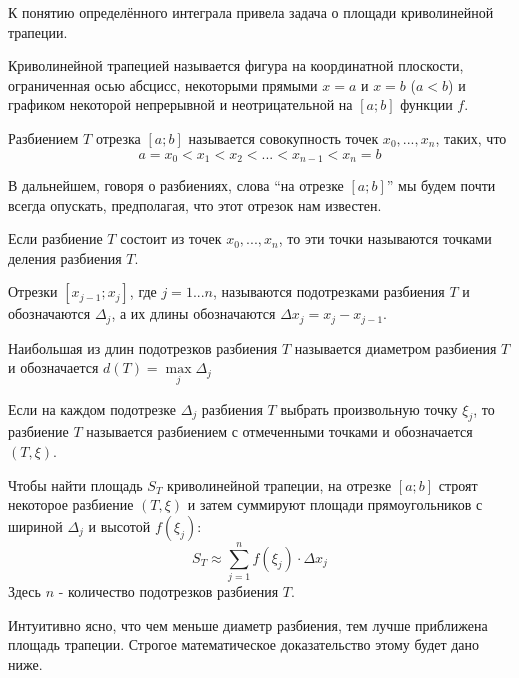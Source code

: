 К понятию определённого интеграла привела задача о площади криволинейной трапеции.

\opred
Криволинейной трапецией называется фигура на координатной плоскости, ограниченная осью абсцисс, некоторыми прямыми $x=a$ и $x=b$ ($a<b$) и графиком некоторой непрерывной и неотрицательной на $[a;b]$ функции $f$.

\opred 
Разбиением $T$ отрезка $[a;b]$ называется совокупность точек ${x_0,...,x_n}$, таких, что 
$$a=x_0<x_1<x_2<...<x_{n-1}<x_n=b$$

В дальнейшем, говоря о разбиениях, слова ``на отрезке $[a;b]$'' мы будем почти всегда опускать, предполагая, что этот отрезок нам известен.

\opred
Если разбиение $T$ состоит из точек ${x_0,...,x_n}$, то эти точки называются точками деления разбиения $T$.

\opred
Отрезки $[x_{j-1};x_j]$, где $j=1...n$, называются подотрезками разбиения $T$ и обозначаются $\Delta_j$, а их длины обозначаются $\Delta x_j=x_j-x_{j-1}$.

\opred
Наибольшая из длин подотрезков разбиения $T$ называется диаметром разбиения $T$ и обозначается $d(T)=\max\limits_j \Delta_j$

\opred
Если на каждом подотрезке $\Delta_j$ разбиения $T$ выбрать произвольную точку $\xi_j$, то разбиение $T$ называется разбиением с отмеченными точками и обозначается $(T,\xi)$.

Чтобы найти площадь $S_T$ криволинейной трапеции, на отрезке $[a;b]$ строят некоторое разбиение $(T,\xi)$ и затем суммируют площади прямоугольников с шириной $\Delta_j$ и высотой $f(\xi_j)$:
$$S_T \approx \sum_{j=1}^{n}f(\xi_j)\cdot \Delta x_j$$
Здесь $n$ - количество подотрезков разбиения $T$.

Интуитивно ясно, что чем меньше диаметр разбиения, тем лучше приближена площадь трапеции. Строгое математическое доказательство этому будет дано ниже.

